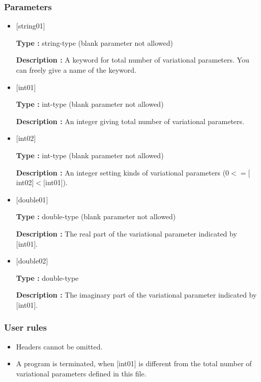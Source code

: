 \subsubsection{Parameters}
 \begin{itemize}

   \item  $[$string01$]$
   
    {\bf Type :} string-type (blank parameter not allowed)

   {\bf Description :} A keyword for total number of variational parameters. You can freely give a name of the keyword. 

   \item  $[$int01$]$
   
    {\bf Type :} int-type (blank parameter not allowed)

   {\bf Description :} An integer giving total number of variational parameters.

  \item  $[$int02$]$
  
 {\bf Type :} int-type (blank parameter not allowed)

{\bf Description :} An integer setting kinds of variational  parameters ($0<= [$int02$]<[$int01]).
 
 \item  $[$double01$]$
   
   {\bf Type :} double-type (blank parameter not allowed)

  {\bf Description :} The real part of the variational parameter indicated by [int01].
  
   \item  $[$double02$]$
   
   {\bf Type :} double-type 

  {\bf Description :} The imaginary part of the variational parameter indicated by [int01].
  
\end{itemize}

\subsubsection{User rules}
\begin{itemize}
\item Headers cannot be omitted. 
\item A program is terminated, when $[$int01$]$ is different from the total number of variational parameters defined in this file.
\end{itemize}

